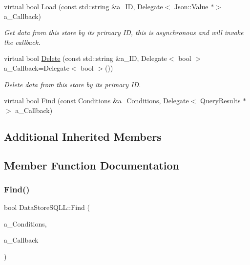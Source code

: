 \begin{DoxyCompactItemize}
\mbox{\label{class_data_store_s_q_l_l_ae041df984085331486d97ba819adb896}} 
virtual bool \hyperlink{class_data_store_s_q_l_l_ae041df984085331486d97ba819adb896}{Load} (const std\+::string \&a\+\_\+\+ID, Delegate$<$ Json\+::\+Value $\ast$$>$ a\+\_\+\+Callback)
\begin{DoxyCompactList}\small\item\em Get data from this store by it\textquotesingle{}s primary ID, this is asynchronous and will invoke the callback. \end{DoxyCompactList}\item 
\mbox{\label{class_data_store_s_q_l_l_a1a8cbf495f74cfb43ed9d46bc9cc91cb}} 
virtual bool \hyperlink{class_data_store_s_q_l_l_a1a8cbf495f74cfb43ed9d46bc9cc91cb}{Delete} (const std\+::string \&a\+\_\+\+ID, Delegate$<$ bool $>$ a\+\_\+\+Callback=Delegate$<$ bool $>$())
\begin{DoxyCompactList}\small\item\em Delete data from this store by it\textquotesingle{}s primary ID. \end{DoxyCompactList}\item 
virtual bool \hyperlink{class_data_store_s_q_l_l_ad2da91d2589839e6e02d3030c9fd832d}{Find} (const Conditions \&a\+\_\+\+Conditions, Delegate$<$ Query\+Results $\ast$$>$ a\+\_\+\+Callback)
\end{DoxyCompactItemize}
\subsection*{Additional Inherited Members}


\subsection{Member Function Documentation}
\mbox{\label{class_data_store_s_q_l_l_ad2da91d2589839e6e02d3030c9fd832d}} 
\subsubsection{\texorpdfstring{Find()}{Find()}}
{\footnotesize\ttfamily bool Data\+Store\+S\+Q\+L\+L\+::\+Find (\begin{DoxyParamCaption}\item[{const Conditions \&}]{a\+\_\+\+Conditions,  }\item[{Delegate$<$ Query\+Results $\ast$$>$}]{a\+\_\+\+Callback }\end{DoxyParamCaption})\hspace{0.3cm}{\ttfamily [virtual]}}


